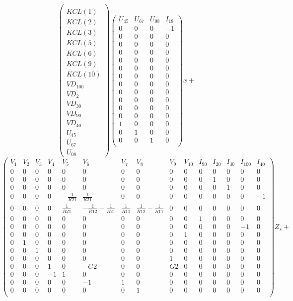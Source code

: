 \documentclass[10pt]{article}
\begin{document}
\[
\left(\begin{array}{c}
  \\
KCL(1)\\KCL(2)\\KCL(3)\\KCL(5)\\KCL(6)\\KCL(9)\\KCL(10)\\VD_{100}\\VD_{2}\\VD_{30}\\VD_{90}\\VD_{40}\\U_{45}\\U_{67}\\U_{08}
\end{array}\right)
\left(\begin{array}{cccc}
  U_{45}&U_{67}&U_{08}&I_{18}\\
  \hline
  0&0&0&-1\\
  0&0&0&0\\
  0&0&0&0\\
  0&0&0&0\\
  0&0&0&0\\
  0&0&0&0\\
  0&0&0&0\\
  0&0&0&0\\
  0&0&0&0\\
  0&0&0&0\\
  0&0&0&0\\
  0&0&0&0\\
  1&0&0&0\\
  0&1&0&0\\
  0&0&1&0\\
\end{array}\right)x+\]
\[
\left(\begin{array}{ccccccccccccccc}
  V_{1}&V_{2}&V_{3}&V_{4}&V_{5}&V_{6}&V_{7}&V_{8}&V_{9}&V_{10}&I_{90}&I_{20}&I_{30}&I_{100}&I_{40}\\
  \hline
  0&0&0&0&0&0&0&0&0&0&0&0&0&0&0\\
  0&0&0&0&0&0&0&0&0&0&0&1&0&0&0\\
  0&0&0&0&0&0&0&0&0&0&0&0&1&0&0\\
  0&0&0&0&-\frac{1}{R21}&\frac{1}{R21}&0&0&0&0&0&0&0&0&-1\\
  0&0&0&0&\frac{1}{R21}&-\frac{1}{R12}-\frac{1}{R21}&\frac{1}{R11}&\frac{1}{R12}-\frac{1}{R11}&0&0&0&0&0&0&0\\
  0&0&0&0&0&0&0&0&0&0&1&0&0&0&0\\
  0&0&0&0&0&0&0&0&0&0&0&0&0&-1&0\\
  0&0&0&0&0&0&0&0&0&1&0&0&0&0&0\\
  0&1&0&0&0&0&0&0&0&0&0&0&0&0&0\\
  0&0&1&0&0&0&0&0&0&0&0&0&0&0&0\\
  0&0&0&0&0&0&0&0&1&0&0&0&0&0&0\\
  0&0&0&1&0&-G2&0&0&G2&0&0&0&0&0&0\\
  0&0&0&-1&1&0&0&0&0&0&0&0&0&0&0\\
  0&0&0&0&0&-1&1&0&0&0&0&0&0&0&0\\
  0&0&0&0&0&0&0&1&0&0&0&0&0&0&0\\
\end{array}\right)Z_{s}+\]
\end{document}
